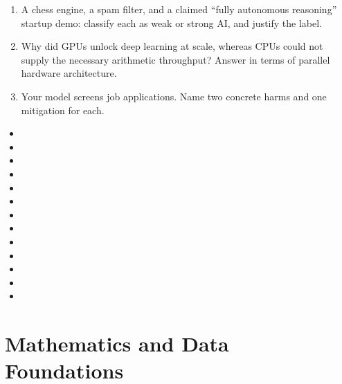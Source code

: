 \documentclass[11pt,a4paper]{article}
\begin{document}
	\begin{checkpoint}
		\begin{enumerate}
			\item A chess engine, a spam filter, and a claimed ``fully autonomous
			reasoning'' startup demo: classify each as weak or strong AI, and
			justify the label.
			\item Why did GPUs unlock deep learning at scale, whereas CPUs could not supply the necessary arithmetic throughput? Answer in terms of parallel hardware architecture.
			\item Your model screens job applications. Name two concrete harms and
			one mitigation for each.
		\end{enumerate}
	\end{checkpoint}
	
	\begin{sourcesbox}
		\small
		\begin{itemize}[nosep]
			\item {}
			\item {}
			\item {}
			\item {}
			\item {}
			\item {}
			\item {}
			\item {}
			\item {}
			\item {}
			\item {}
			\item {}
			\item {}
		\end{itemize}
	\end{sourcesbox}
	
	\clearpage
	\section{Mathematics and Data Foundations}
	
\end{document}
